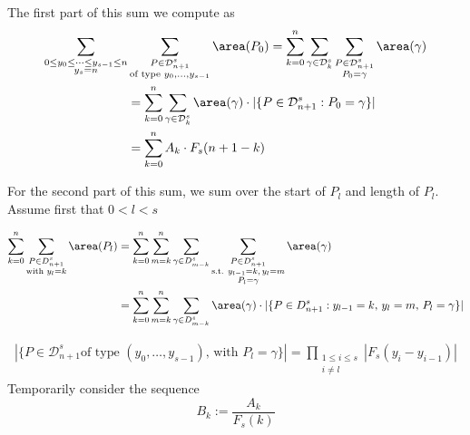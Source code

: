 \documentclass[12pt]{article}
\begin{document}
The first part of this sum we compute as 
\begin{align*}
    \sum_{\substack{0\leq y_{0}\leq \cdots\leq y_{s-1}\leq n\\y_{s}=n}}& \sum_{\substack{P\in \mathcal{D}_{n+1}^{s}\\\text{of type }y_{0},\ldots, y_{s-1}}} \area(P_{0}) = \sum_{k=0}^{n} \sum_{\gamma\in \mathcal{D}_{k}^{s}} \sum_{\substack{P\in \mathcal{D}_{n+1}^{s}\\P_{0}=\gamma}} \area(\gamma) \\
    &= \sum_{k=0}^{n} \sum_{\gamma\in \mathcal{D}_{k}^{s}}\area(\gamma)\cdot |\{P\in \mathcal{D}_{n+1}^{s}: P_{0}=\gamma\}|\\
    &= \sum_{k=0}^{n} A_{k}\cdot F_{s}(n+1-k)\\
\end{align*}

For the second part of this sum, we sum over the start of $ P_{l} $ and length of $ P_{l} $. Assume first that $ 0<l<s $

\begin{align*}
    \sum_{k=0}^{n} \sum_{\substack{P\in D_{n+1}^{s}\\\text{with }y_{l}=k }} \area(P_{l}) &= \sum_{k=0}^{n} \sum_{m=k}^{n}\sum_{\gamma\in D_{m-k}^{s}}\sum_{\substack{P\in D_{n+1}^{s}\\\text{s.t. }y_{l-1}=k,\, y_{l}=m\\P_{l}=\gamma}}  \area(\gamma)  \\
    &= \sum_{k=0}^{n} \sum_{m=k}^{n}\sum_{\gamma\in D_{m-k}^{s}} \area(\gamma) \cdot |\{P\in D_{n+1}^{s}:y_{l-1}=k,\, y_{l}=m,\, P_{l}=\gamma\}|\\
\end{align*}

\begin{align*}
    |\{P\in \mathcal{D}_{n+1}^{s} \text{of type }(y_{0},\ldots, y_{s-1}),\,\text{with } P_{l}=\gamma\}| = \prod_{\substack{1\leq i \leq s\\i\neq l}} |F_{s}(y_{i}-y_{i-1})|
\end{align*}
Temporarily consider the sequence 
\[
    B_{k} := \frac{A_{k}}{F_{s}(k)} 
\]
\end{document}
